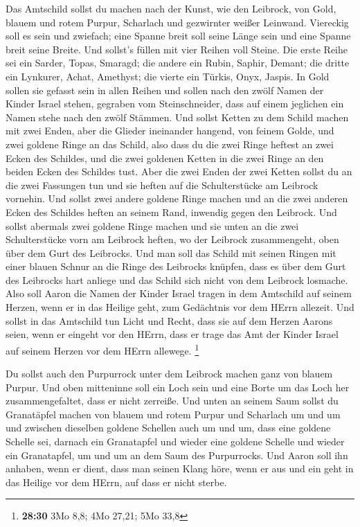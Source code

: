  Das Amtschild sollst du machen nach der Kunst, wie den
Leibrock, von Gold, blauem und rotem Purpur, Scharlach und gezwirnter
weißer Leinwand.  Viereckig soll es sein und zwiefach; eine
Spanne breit soll seine Länge sein und eine Spanne breit seine Breite.
 Und sollst's füllen mit vier Reihen voll Steine. Die erste
Reihe sei ein Sarder, Topas, Smaragd;  die andere ein
Rubin, Saphir, Demant;  die dritte ein Lynkurer, Achat,
Amethyst;  die vierte ein Türkis, Onyx, Jaspis. In Gold
sollen sie gefasst sein in allen Reihen  und sollen nach
den zwölf Namen der Kinder Israel stehen, gegraben vom Steinschneider,
dass auf einem jeglichen ein Namen stehe nach den zwölf Stämmen.
 Und sollst Ketten zu dem Schild machen mit zwei Enden,
aber die Glieder ineinander hangend, von feinem Golde,  und
zwei goldene Ringe an das Schild, also dass du die zwei Ringe heftest an
zwei Ecken des Schildes,  und die zwei goldenen Ketten in
die zwei Ringe an den beiden Ecken des Schildes tust.  Aber
die zwei Enden der zwei Ketten sollst du an die zwei Fassungen tun und
sie heften auf die Schulterstücke am Leibrock vornehin. 
Und sollst zwei andere goldene Ringe machen und an die zwei anderen
Ecken des Schildes heften an seinem Rand, inwendig gegen den Leibrock.
 Und sollst abermals zwei goldene Ringe machen und sie
unten an die zwei Schulterstücke vorn am Leibrock heften, wo der
Leibrock zusammengeht, oben über dem Gurt des Leibrocks. 
Und man soll das Schild mit seinen Ringen mit einer blauen Schnur an die
Ringe des Leibrocks knüpfen, dass es über dem Gurt des Leibrocks hart
anliege und das Schild sich nicht von dem Leibrock losmache.
 Also soll Aaron die Namen der Kinder Israel tragen in dem
Amtschild auf seinem Herzen, wenn er in das Heilige geht, zum Gedächtnis
vor dem HErrn allezeit.  Und sollst in das Amtschild tun
Licht und Recht, dass sie auf dem Herzen Aarons seien, wenn er eingeht
vor den HErrn, dass er trage das Amt der Kinder Israel auf seinem Herzen
vor dem HErrn allewege. \footnote{\textbf{28:30} 3Mo 8,8; 4Mo 27,21; 5Mo
  33,8}

 Du sollst auch den Purpurrock unter dem Leibrock machen
ganz von blauem Purpur.  Und oben mitteninne soll ein Loch
sein und eine Borte um das Loch her zusammengefaltet, dass er nicht
zerreiße.  Und unten an seinem Saum sollst du Granatäpfel
machen von blauem und rotem Purpur und Scharlach um und um und zwischen
dieselben goldene Schellen auch um und um,  dass eine
goldene Schelle sei, darnach ein Granatapfel und wieder eine goldene
Schelle und wieder ein Granatapfel, um und um an dem Saum des
Purpurrocks.  Und Aaron soll ihn anhaben, wenn er dient,
dass man seinen Klang höre, wenn er aus und ein geht in das Heilige vor
dem HErrn, auf dass er nicht sterbe.

